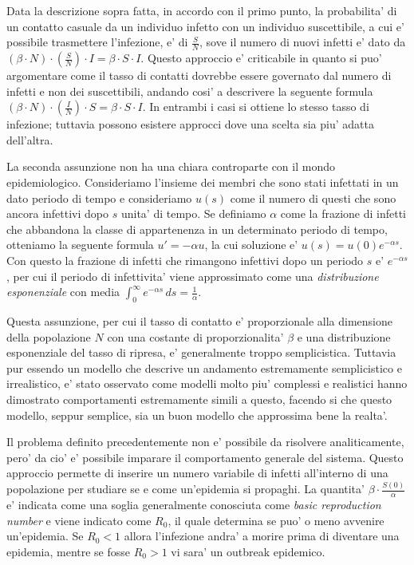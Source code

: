 Data la descrizione sopra fatta, in accordo con il primo punto, la probabilita' di un contatto casuale da un individuo 
infetto con un individuo suscettibile, a cui e' possibile trasmettere l'infezione, e' di $\frac{S}{N}$, sove il numero di nuovi 
infetti e' dato da $(\beta \cdot N) \cdot (\frac{S}{N}) \cdot I = \beta \cdot S \cdot I$. Questo approccio e' criticabile in quanto 
si puo' argomentare come il tasso di contatti dovrebbe essere governato dal numero di infetti e non dei suscettibili, andando 
cosi' a descrivere la seguente formula $(\beta \cdot N) \cdot (\frac{I}{N}) \cdot S = \beta \cdot S \cdot I$. In entrambi i casi 
si ottiene lo stesso tasso di infezione; tuttavia possono esistere approcci dove una scelta sia piu' adatta dell'altra.

La seconda assunzione non ha una chiara controparte con il mondo epidemiologico. Consideriamo l'insieme dei membri che sono stati infettati 
in un dato periodo di tempo e consideriamo $u(s)$ come il numero di questi che sono ancora infettivi dopo $s$ unita' di tempo. Se definiamo 
$\alpha$ come la frazione di infetti che abbandona la classe di appartenenza in un determinato periodo di tempo, otteniamo la seguente formula
$u' = - \alpha u$, la cui soluzione e' $u(s) = u(0) e^{-\alpha s}$. Con questo la frazione di infetti che rimangono infettivi dopo un periodo 
$s$ e' $e^{-\alpha s}$, per cui il periodo di infettivita' viene approssimato come una \emph{distribuzione esponenziale} con media 
$\int_{0}^{\infty} e^{-\alpha s} \,ds = \frac{1}{\alpha}$.

Questa assunzione, per cui il tasso di contatto e' proporzionale alla dimensione della popolazione $N$ con una costante di 
proporzionalita' $\beta$  e una distribuzione esponenziale del tasso di ripresa, e' generalmente troppo semplicistica. Tuttavia pur essendo 
un modello che descrive un andamento estremamente semplicistico e irrealistico, e' stato osservato come modelli molto piu' complessi e realistici 
hanno dimostrato comportamenti estremamente simili a questo, facendo si che questo modello, seppur semplice, sia un buon modello che approssima bene 
la realta'.

Il problema definito precedentemente non e' possibile da risolvere analiticamente, pero' da cio' e' possibile imparare il comportamento generale del sistema.
Questo approccio permette di inserire un numero variabile di infetti all'interno di una popolazione per studiare se e come 
un'epidemia si propaghi. La quantita' $\beta \cdot \frac{S(0)}{\alpha}$ e' indicata come una soglia generalmente conosciuta 
come \emph{basic reproduction number} e viene indicato come $R_0$, il quale determina se puo' o meno avvenire un'epidemia. 
Se $R_0 < 1$ allora l'infezione andra' a morire prima di diventare una epidemia, mentre se fosse $R_0 > 1$ vi sara' 
un outbreak epidemico.

